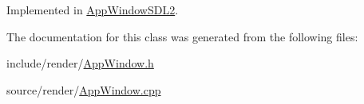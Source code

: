 Implemented in \hyperlink{classAppWindowSDL2_a87c1dc4ef0a137fd0f2080c568c74cc2}{App\-Window\-S\-D\-L2}.



The documentation for this class was generated from the following files\-:\begin{DoxyCompactItemize}
\item 
include/render/\hyperlink{AppWindow_8h}{App\-Window.\-h}\item 
source/render/\hyperlink{AppWindow_8cpp}{App\-Window.\-cpp}\end{DoxyCompactItemize}
